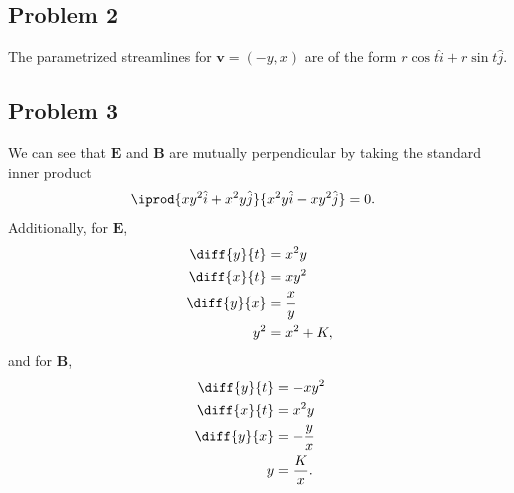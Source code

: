 \documentclass[10pt]{mypackage}
\begin{document}
\begin{enumerate}[(a)]
\begin{center}
    \end{center}
\end{enumerate}
\subsection{Problem 2}%
The parametrized streamlines for $\mathbf{v} = \left(-y,x\right)$ are of the form $r\cos t \hat{i} + r\sin t \hat{j}$.
\subsection{Problem 3}%
We can see that $\mathbf{E}$ and $\mathbf{B}$ are mutually perpendicular by taking the standard inner product
\begin{align*}
  \iprod{xy^2\hat{i} + x^2y\hat{j}}{x^2y\hat{i} - xy^2\hat{j}} &=0.
\end{align*}
Additionally, for $\mathbf{E}$,
\begin{align*}
  \diff{y}{t} &= x^2 y\\
  \diff{x}{t} &= xy^2\\
  \diff{y}{x} &= \frac{x}{y}\\
  y^2 &= x^2 + K,
\end{align*}
and for $\mathbf{B}$,
\begin{align*}
  \diff{y}{t} &= -xy^2\\
  \diff{x}{t} &= x^2 y\\
  \diff{y}{x} &= -\frac{y}{x}\\
  y &= \frac{K}{x}.
\end{align*}
\end{document}
